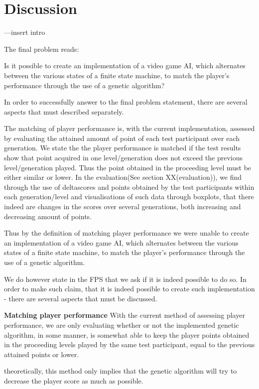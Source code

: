 \section{Discussion} \label{sec:discussion}

---insert intro


The final problem reads:

Is it possible to create an implementation of a video game AI, which alternates between the various states of a finite state machine, to match the player's performance through the use of a genetic algorithm?



In order to successfully answer to the final problem statement, there are several aspects that must described separately.

The matching of player performance is, with the current implementation, assessed by evaluating the attained amount of point of each test participant over each generation. We state the the player performance is matched if the test results show that point acquired in one level/generation does not exceed the previous level/generation played. Thus the point obtained in the proceeding level must be either similar or lower.
In the evaluation(See section XX(evaluation)), we find through the use of deltascores and points obtained by the test participants within each generation/level and visualisations of such data through boxplots, that there indeed are changes in the scores over several generations, both increasing and decreasing amount of points.

Thus by the definition of matching player performance we were unable to create an implementation of a video game AI, which alternates between the various states of a finite state machine, to match the player's performance through the use of a genetic algorithm.

We do however state in the FPS that we ask if it is indeed possible to do so. In order to make such claim, that it is indeed possible to create such implementation - there are several aspects that must be discussed.

\textbf{Matching player performance}
With the current method of assessing player performance, we are only evaluating whether or not the implemented genetic algorithm, in some manner, is somewhat able to keep the player points obtained in the proceeding levels played by the same test participant, equal to the previous attained points or lower.


theoretically, this method only implies that the genetic algorithm will try to decrease the player score as much as possible.

